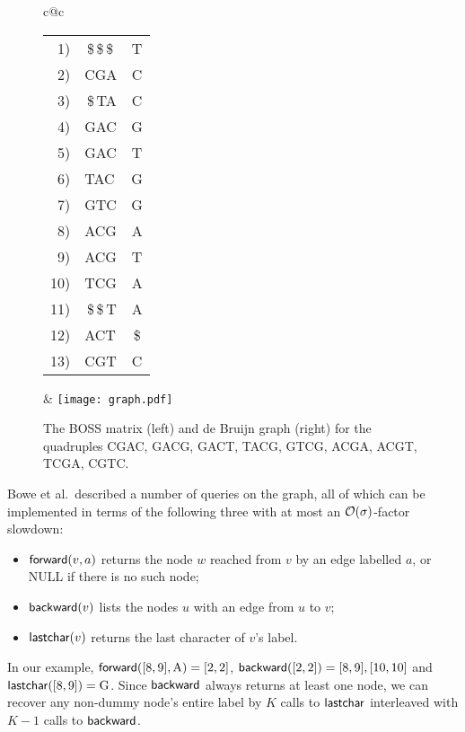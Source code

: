 \begin{figure*}[!t]
\centering
\begin{tabular}{c@{\hspace{10ex}}c}
\begin{tabular}{r@{\hspace{1ex}}@{\hspace{1ex}}@{\hspace{1ex}}l@{\hspace{1ex}}c}
1) & \,\$\,\$\,\$\, & T\\
2) & CGA & C\\
3) & \,\$\,TA & C\\
4) & GAC & G\\
5) & GAC & T\\
6) & TAC & G\\
7) & GTC & G\\
8) & ACG & A\\
9) & ACG & T\\
10) & TCG & A\\
11) & \,\$\,\$\,T & A\\
12) & ACT & \$\\
13) & CGT & C
\end{tabular} &
\raisebox{-10ex}
{\texttt{[image: graph.pdf]}}
\end{tabular}
\caption{The BOSS matrix (left) and de Bruijn graph (right) for the quadruples CGAC, GACG, GACT, TACG, GTCG, ACGA, ACGT, TCGA, CGTC.}
\label{fig:matrix}
\hrulefill
\end{figure*}

Bowe et al.\ described a number of queries on the graph, all of which can be implemented in terms of the following three with at most an $\mathcal{O}\!\left( {\sigma} \right)$-factor slowdown:
\begin{itemize}
\item $\mathsf{forward}(v, a)$ returns the node $w$ reached from $v$ by an edge labelled $a$, or NULL if there is no such node;
\item $\mathsf{backward}(v)$ lists the nodes $u$ with an edge from $u$ to $v$;
\item $\mathsf{lastchar}(v)$ returns the last character of $v$'s label.
\end{itemize}
In our example, \(\mathsf{forward} \allowbreak ([8, 9], \mathrm{A}) \allowbreak =
\allowbreak [2, 2]\),
\(\mathsf{backward} \allowbreak ([2, 2]) \allowbreak = \allowbreak [8, 9], [10, 10]\) and
\(\mathsf{lastchar} \allowbreak ([8, 9]) \allowbreak = \allowbreak \mathrm{G}\).
Since $\mathsf{backward}$ always returns at least one node, we can recover any non-dummy node's entire label by $K$ calls to $\mathsf{lastchar}$ interleaved with \(K - 1\) calls to $\mathsf{backward}$.


